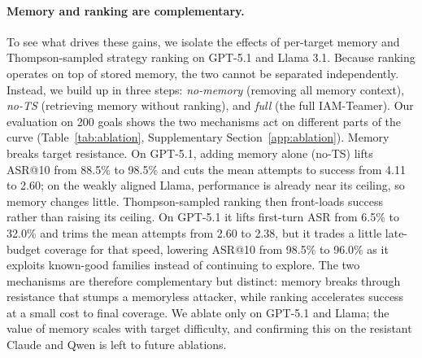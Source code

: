 \paragraph{Memory and ranking are complementary.}
To see what drives these gains, we isolate the effects of per-target memory and Thompson-sampled strategy ranking on GPT-5.1 and Llama 3.1.
Because ranking operates on top of stored memory, the two cannot be separated independently.
Instead, we build up in three steps: \emph{no-memory} (removing all memory context), \emph{no-TS} (retrieving memory without ranking), and \emph{full} (the full IAM-Teamer).
Our evaluation on 200 goals shows the two mechanisms act on different parts of the curve (Table~\ref{tab:ablation}, Supplementary Section~\ref{app:ablation}).
Memory breaks target resistance. On GPT-5.1, adding memory alone (no-TS) lifts ASR@10 from 88.5\% to 98.5\% and cuts the mean attempts to success from 4.11 to 2.60; on the weakly aligned Llama, performance is already near its ceiling, so memory changes little.
Thompson-sampled ranking then front-loads success rather than raising its ceiling. On GPT-5.1 it lifts first-turn ASR from 6.5\% to 32.0\% and trims the mean attempts from 2.60 to 2.38, but it trades a little late-budget coverage for that speed, lowering ASR@10 from 98.5\% to 96.0\% as it exploits known-good families instead of continuing to explore.
The two mechanisms are therefore complementary but distinct: memory breaks through resistance that stumps a memoryless attacker, while ranking accelerates success at a small cost to final coverage.
We ablate only on GPT-5.1 and Llama; the value of memory scales with target difficulty, and confirming this on the resistant Claude and Qwen is left to future ablations.

